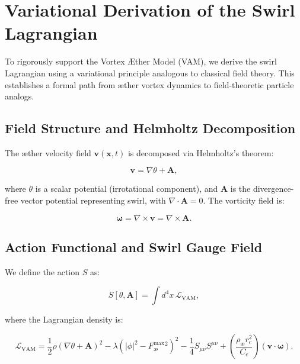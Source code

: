 \section{Variational Derivation of the Swirl Lagrangian}

To rigorously support the Vortex Æther Model (VAM), we derive the swirl Lagrangian using a variational principle analogous to classical field theory. This establishes a formal path from æther vortex dynamics to field-theoretic particle analogs.

\subsection{Field Structure and Helmholtz Decomposition}

The æther velocity field $\mathbf{v}(\mathbf{x}, t)$ is decomposed via Helmholtz's theorem:

\begin{equation}
\mathbf{v} = \nabla \theta + \mathbf{A},
\end{equation}

where $\theta$ is a scalar potential (irrotational component), and $\mathbf{A}$ is the divergence-free vector potential representing swirl, with $\nabla \cdot \mathbf{A} = 0$. The vorticity field is:

\begin{equation}
\boldsymbol{\omega} = \nabla \times \mathbf{v} = \nabla \times \mathbf{A}.
\end{equation}

\subsection{Action Functional and Swirl Gauge Field}

We define the action $S$ as:

\begin{equation}
S[\theta, \mathbf{A}] = \int d^4x \, \mathcal{L}_{\text{VAM}},
\end{equation}

where the Lagrangian density is:

\begin{equation}
\mathcal{L}_{\text{VAM}} = \frac{1}{2} \rho (\nabla \theta + \mathbf{A})^2 - \lambda (|\phi|^2 - F^{\text{max}}_{\text{\ae}}^2)^2 - \frac{1}{4} S_{\mu\nu} S^{\mu\nu} + \left( \frac{\rho_{\text{æ}} r_c^2}{C_e} \right) (\mathbf{v} \cdot \boldsymbol{\omega}).
\end{equation}

